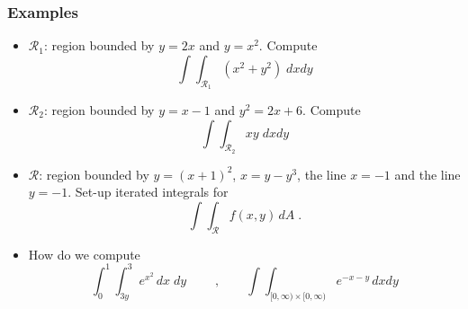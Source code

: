 \begin{frame}
  \frametitle{Examples}

  \begin{itemize}
    \item $\mathcal{R}_1$: region bounded by $y=2x$ and $y=x^2$. Compute
%
$$\int\!\!\!\int_{\mathcal{R}_1} (x^2+y^2) \; dxdy$$

\item $\mathcal{R}_2$: region bounded by $y=x-1$ and $y^2=2x+6$. Compute
%
$$ \int\!\!\!\int_{\mathcal{R}_2} xy \; dxdy$$

\item $\mathcal{R}$: region bounded by
$y=(x+1)^2$, $x=y-y^3$, the line $x=-1$ and the line $y=-1$. Set-up iterated integrals for
%
$$\int\!\!\!\int_{\mathcal{R}} f(x,y) \, dA \; .$$

\item How do we compute
%
$$\int_0^1 \int_{3y}^3 e^{x^2} \, dx \; dy \; \qquad , \qquad  \int\!\!\!\int_{[0,\infty) \times [0,\infty)} e^{-x-y} \, dxdy $$

  \end{itemize}
\end{frame}